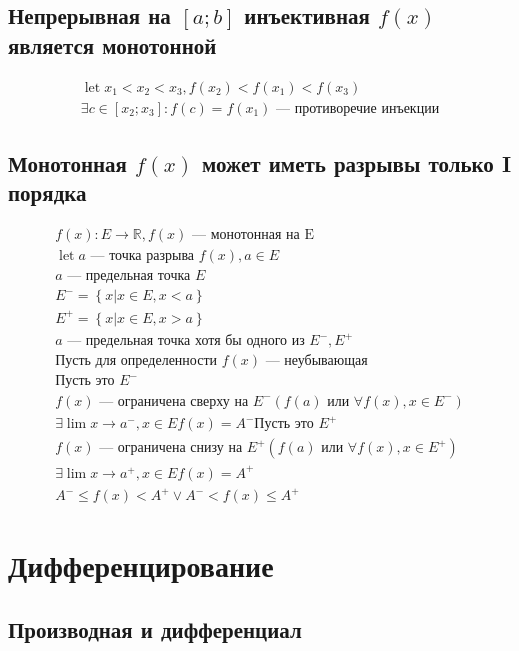 \documentclass{article}
\DeclareMathOperator*{\Let}{let}
\begin{document}
\subsection{Непрерывная на $[a; b]$ инъективная $f(x)$ является монотонной}

\begin{gather*}
	\Let x_1 < x_2 < x_3, f(x_2) < f(x_1) < f(x_3) \\
	\exists c \in [x_2; x_3] : f(c) = f(x_1) \text{ --- противоречие инъекции}
\end{gather*}

\subsection{Монотонная $f(x)$ может иметь разрывы только I порядка}

\begin{gather*}
	f(x) : E \to \mathbb{R}, f(x) \text{ --- монотонная на E} \\
	\Let a \text{ --- точка разрыва } f(x), a \in E \\
	a \text{ --- предельная точка } E \\
	E^- = \left\{ x | x \in E, x < a \right\} \\
	E^+ = \left\{ x | x \in E, x > a \right\} \\
	a \text{ --- предельная точка хотя бы одного из } E^-, E^+ \\
	\text{Пусть для определенности $f(x)$ --- неубывающая} \\
	\text{Пусть это } E^- \\
	f(x) \text{ --- ограничена сверху на } E^- (f(a) \text{ или } \forall f(x), x \in E^-) \\
	\exists \lim{x \to a^-, x \in E} f(x) = A^-
	\text{Пусть это } E^+ \\
	f(x) \text{ --- ограничена снизу на } E^+ (f(a) \text{ или } \forall f(x), x \in E^+) \\
	\exists \lim{x \to a^+, x \in E} f(x) = A^+ \\
	A^- \le f(x) < A^+ \lor A^- < f(x) \le A^+
\end{gather*}

\section{Дифференцирование}

\subsection{Производная и дифференциал}
\end{document}
